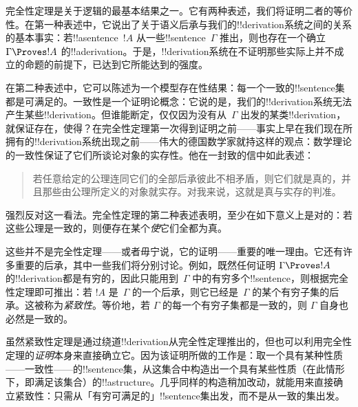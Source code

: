 \documentclass[../../../include/open-logic-section]{subfiles}
\begin{document}
      {}
      {}


完全性定理是关于逻辑的最基本结果之一。它有两种表述，我们将证明二者的等价性。在第一种表述中，它说出了关于语义后承与我们的!!{derivation}系统之间的关系的基本事实：若!!a{sentence}~$!A$ 从一些!!{sentence}~$\Gamma$ 推出，则也存在一个确立 $\Gamma \Proves !A$ 的!!a{derivation}。于是，!!{derivation}系统在不证明那些实际上并不成立的命题的前提下，已达到它所能达到的强度。

在第二种表述中，它可以陈述为一个模型存在性结果：每一个一致的!!{sentence}集都是可满足的。一致性是一个证明论概念：它说的是，我们的!!{derivation}系统无法产生某些!!{derivation}。但谁能断定，仅仅因为没有从~$\Gamma$ 出发的某类!!{derivation}，就保证存在，使得？在完全性定理第一次得到证明之前——事实上早在我们现在所拥有的!!{derivation}系统出现之前——伟大的德国数学家就持这样的观点：数学理论的一致性保证了它们所谈论对象的实存性。他在一封致的信中如此表述：

\begin{quote}
  若任意给定的公理连同它们的全部后承彼此不相矛盾，则它们就是真的，并且那些由公理所定义的对象就实存。对我来说，这就是真与实存的判准。
\end{quote}

强烈反对这一看法。完全性定理的第二种表述表明，至少在如下意义上是对的：若这些公理是一致的，则便存在某个\emph{使}它们全都为真。

这些并不是完全性定理——或者毋宁说，它的证明——重要的唯一理由。它还有许多重要的后承，其中一些我们将分别讨论。例如，既然任何证明 $\Gamma \Proves !A$ 的!!{derivation}都是有穷的，因此只能用到~$\Gamma$ 中的有穷多个!!{sentence}，则根据完全性定理即可推出：若 $!A$ 是~$\Gamma$ 的一个后承，则它已经是~$\Gamma$ 的某个有穷子集的后承。这被称为\emph{紧致性}。等价地，若 $\Gamma$ 的每一个有穷子集都是一致的，则 $\Gamma$ 自身也必然是一致的。

虽然紧致性定理是通过绕道!!{derivation}从完全性定理推出的，但也可以利用完全性定理的\emph{证明}本身来直接确立它。因为该证明所做的工作是：取一个具有某种性质——一致性——的!!{sentence}集，从这集合中构造出一个具有某些性质（在此情形下，即满足该集合）的!!a{structure}。几乎同样的构造稍加改动，就能用来直接确立紧致性：只需从「有穷可满足的」!!{sentence}集出发，而不是从一致的集出发。
\end{document}
